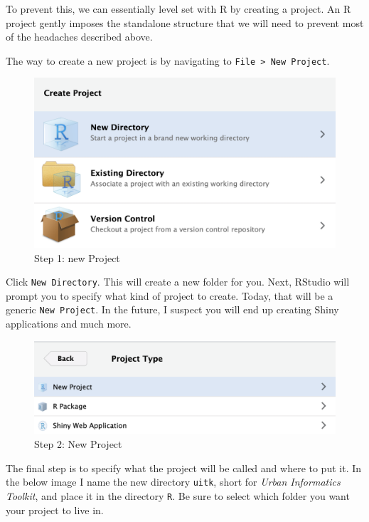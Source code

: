 \documentclass[
]{book}
\begin{document}
To prevent this, we can essentially level set with R by creating a project. An R project gently imposes the standalone structure that we will need to prevent most of the headaches described above.

The way to create a new project is by navigating to \texttt{File\ \textgreater{}\ New\ Project}.

\begin{figure}
\centering
\includegraphics{static/01-project.png}
\caption{Step 1: new Project}
\end{figure}

Click \texttt{New\ Directory}. This will create a new folder for you. Next, RStudio will prompt you to specify what kind of project to create. Today, that will be a generic \texttt{New\ Project}. In the future, I suspect you will end up creating Shiny applications and much more.

\begin{figure}
\centering
\includegraphics{static/02-project.png}
\caption{Step 2: New Project}
\end{figure}

The final step is to specify what the project will be called and where to put it. In the below image I name the new directory \texttt{uitk}, short for \emph{Urban Informatics Toolkit}, and place it in the directory \texttt{R}. Be sure to select which folder you want your project to live in.
\end{document}
